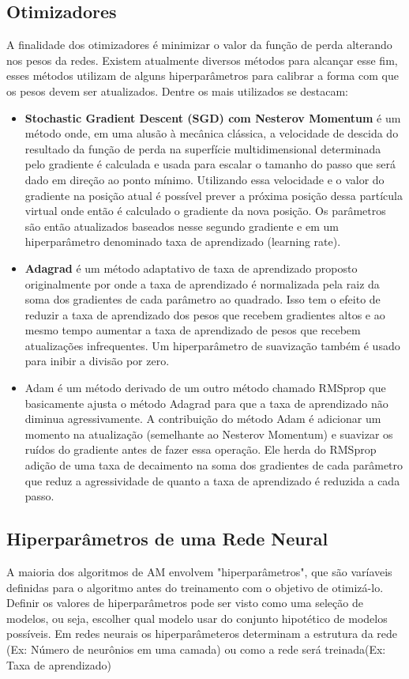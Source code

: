 \subsection{Otimizadores}
A finalidade dos otimizadores é minimizar o valor da função de perda alterando nos pesos da redes. Existem atualmente diversos métodos para alcançar esse fim, esses métodos utilizam de alguns hiperparâmetros para calibrar a forma com que os pesos devem ser atualizados. Dentre os mais utilizados se destacam:
\begin{itemize}
	\item \textbf{ Stochastic Gradient Descent (SGD) com Nesterov Momentum} é um método onde, em uma alusão à mecânica clássica, a velocidade de descida do resultado da função de perda na superfície multidimensional determinada pelo gradiente é calculada e usada para escalar o tamanho do passo que será dado em direção ao ponto mínimo. Utilizando essa velocidade e o valor do gradiente na posição atual é possível prever a próxima posição dessa partícula virtual onde então é calculado o gradiente da nova posição. Os parâmetros são então atualizados baseados nesse segundo gradiente e em um hiperparâmetro denominado taxa de aprendizado (learning rate). \cite{bengio2012}
	\item \textbf{Adagrad} é um método adaptativo de taxa de aprendizado proposto originalmente por \cite{adagrad2011} onde a taxa de aprendizado é normalizada pela raiz da soma dos gradientes de cada parâmetro ao quadrado. Isso tem o efeito de reduzir a taxa de aprendizado dos pesos que recebem gradientes altos e ao mesmo tempo aumentar a taxa de aprendizado de pesos que recebem atualizações infrequentes. Um hiperparâmetro de suavização também é usado para inibir a divisão por zero.
	\item Adam é um método derivado de um outro método chamado RMSprop que basicamente ajusta o método Adagrad para que a taxa de aprendizado não diminua agressivamente. A contribuição do método Adam é adicionar um momento na atualização (semelhante ao Nesterov Momentum) e suavizar os ruídos do gradiente antes de fazer essa operação. Ele herda do RMSprop  adição de uma taxa de decaimento na soma dos gradientes de cada parâmetro que reduz a agressividade de quanto a taxa de aprendizado é reduzida a cada passo. \cite{adam2014}
\end{itemize}

\subsection{Hiperparâmetros de uma Rede Neural}
A maioria dos algoritmos de AM envolvem "hiperparâmetros", que são varíaveis definidas para o algoritmo antes do treinamento com o objetivo de otimizá-lo. Definir os valores de hiperparâmetros pode ser visto como uma seleção de modelos, ou seja, escolher qual modelo usar do conjunto hipotético de modelos possíveis. Em redes neurais os hiperparâmeteros determinam a estrutura da rede (Ex: Número de neurônios em uma camada) ou como a rede será treinada(Ex: Taxa de aprendizado)

